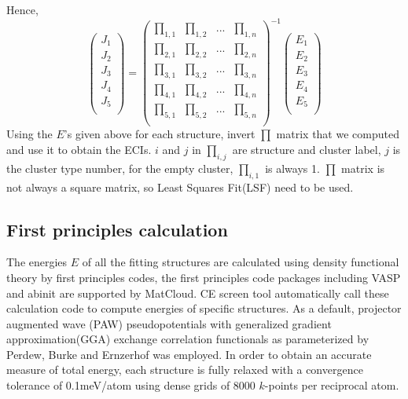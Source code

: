 \documentclass[aps,preprint,amsmath,amssymb]{revtex4}
\begin{document}
Hence,
\begin{equation}\label{EJ-inverse}
   \left(
     \begin{array}{c}
       J_{1} \\
       J_{2} \\
       J_{3} \\
       J_{4} \\
       J_{5} \\
     \end{array}
   \right)=\left(
              \begin{array}{cccc}
                \prod_{1,1} & \prod_{1,2} & ... & \prod_{1,n} \\
                \prod_{2,1} & \prod_{2,2} & ... & \prod_{2,n} \\
                \prod_{3,1} & \prod_{3,2} & ... & \prod_{3,n} \\
                \prod_{4,1} & \prod_{4,2} & ... & \prod_{4,n} \\
                \prod_{5,1} & \prod_{5,2} & ... & \prod_{5,n} \\
              \end{array}
            \right)^{-1}
            \left(
              \begin{array}{c}
                E_{1} \\
                E_{2} \\
                E_{3} \\
                E_{4} \\
                E_{5} \\
              \end{array}
            \right)
\end{equation}
Using the $E$'s given above for each structure, invert $\prod$ matrix that we computed and use it to obtain the ECIs.
$i$ and $j$ in $\prod_{i,j}$ are structure and cluster label,
$j$ is the cluster type number, for the empty cluster, $\prod_{i,1}$ is always 1.
$\prod$ matrix is not always a square matrix, so Least Squares Fit(LSF) need to be used.
\subsection{First principles calculation}\label{parameters}
The energies $E$ of all the fitting structures are calculated using density functional theory by first
principles codes, the first principles code packages including VASP and abinit are supported by MatCloud.
CE screen tool automatically call these calculation code to compute energies of specific structures.
As a default, projector augmented wave (PAW) pseudopotentials with generalized gradient approximation(GGA)
exchange correlation functionals as parameterized by Perdew, Burke and Ernzerhof was employed.
In order to obtain an accurate measure of total energy, each structure is fully relaxed
with a convergence tolerance of 0.1meV/atom using dense grids of
$8000$ $k$-points per reciprocal atom.
\end{document}
